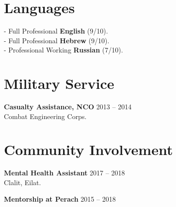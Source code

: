 \documentclass[
	12pt,a4paper %
]{article}
\newcommand{\tableentry}[3]{
	\textsc{#1} & #2\expandafter\ifstrequal\expandafter{#3}{}{\\}{\\[5pt]} %
}
\begin{document}
\begin{paracol}{2}
\switchcolumn


\section{Languages}
 - Full Professional \textbf{English} (9/10). \\
 - Full Professional \textbf{Hebrew} (9/10). \\
 - Professional Working \textbf{Russian} (7/10).
\section{Military Service}
\textbf{Casualty Assistance, NCO} \hfill 2013 -- 2014 \\
Combat Engineering Corps.

 \section{Community Involvement}

 \textbf{Mental Health Assistant} \hfill 2017 -- 2018 \\
 Clalit, Eilat.

 \textbf{Mentorship at Perach} \hfill 2015 -- 2018
\end{paracol} %
\end{document}
